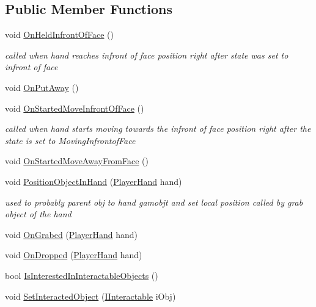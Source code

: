 \subsection*{Public Member Functions}
\begin{DoxyCompactItemize}
\item 
void \mbox{\hyperlink{interface_i_holdable_object_a6f63fec8fb8f715ad5cdd08aa5ec0ea5}{On\+Held\+Infront\+Of\+Face}} ()
\begin{DoxyCompactList}\small\item\em called when hand reaches infront of face position right after state was set to infront of face \end{DoxyCompactList}\item 
void \mbox{\hyperlink{interface_i_holdable_object_abe7c5e5ed97fb5c908c91da5b8714f0e}{On\+Put\+Away}} ()
\item 
void \mbox{\hyperlink{interface_i_holdable_object_af5dcdd5524539104706dadd8a0e15e08}{On\+Started\+Move\+Infront\+Of\+Face}} ()
\begin{DoxyCompactList}\small\item\em called when hand starts moving towards the infront of face position right after the state is set to Moving\+Infrontof\+Face \end{DoxyCompactList}\item 
void \mbox{\hyperlink{interface_i_holdable_object_a75f802a9736db51e5e8d1568689dd11c}{On\+Started\+Move\+Away\+From\+Face}} ()
\item 
void \mbox{\hyperlink{interface_i_holdable_object_a3fe2e7a7d0740225142053583f438333}{Position\+Object\+In\+Hand}} (\mbox{\hyperlink{class_player_hand}{Player\+Hand}} hand)
\begin{DoxyCompactList}\small\item\em used to probably parent obj to hand gamobjt and set local position called by grab object of the hand \end{DoxyCompactList}\item 
void \mbox{\hyperlink{interface_i_holdable_object_a7b8a42a0c12a26b1668c4dd904f38355}{On\+Grabed}} (\mbox{\hyperlink{class_player_hand}{Player\+Hand}} hand)
\item 
void \mbox{\hyperlink{interface_i_holdable_object_a19523673c41505d8533aa50b957e95a1}{On\+Dropped}} (\mbox{\hyperlink{class_player_hand}{Player\+Hand}} hand)
\item 
bool \mbox{\hyperlink{interface_i_holdable_object_a0356d534c17ab4e04fba00b42abeea77}{Is\+Interested\+In\+Interactable\+Objects}} ()
\item 
void \mbox{\hyperlink{interface_i_holdable_object_aeb32a55273b99d16f9fb5b86f6a73f80}{Set\+Interacted\+Object}} (\mbox{\hyperlink{interface_i_interactable}{I\+Interactable}} i\+Obj)
\end{DoxyCompactItemize}
